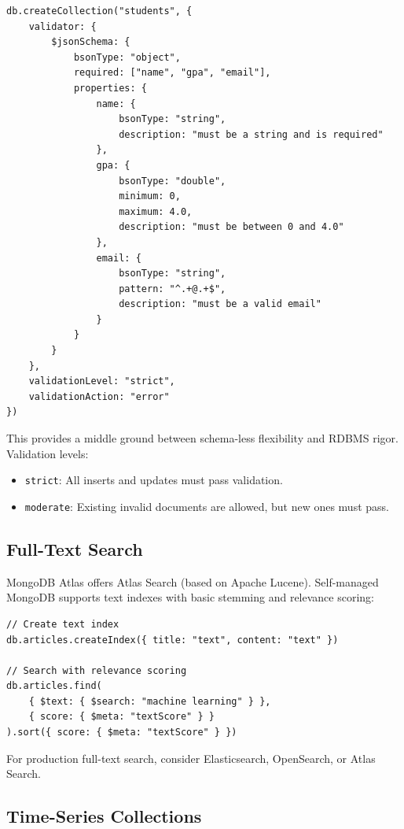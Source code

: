 \documentclass[12pt,a4paper]{article}
\begin{document}
\begin{lstlisting}[language=MongoDB]
db.createCollection("students", {
    validator: {
        $jsonSchema: {
            bsonType: "object",
            required: ["name", "gpa", "email"],
            properties: {
                name: {
                    bsonType: "string",
                    description: "must be a string and is required"
                },
                gpa: {
                    bsonType: "double",
                    minimum: 0,
                    maximum: 4.0,
                    description: "must be between 0 and 4.0"
                },
                email: {
                    bsonType: "string",
                    pattern: "^.+@.+$",
                    description: "must be a valid email"
                }
            }
        }
    },
    validationLevel: "strict",
    validationAction: "error"
})
\end{lstlisting}

This provides a middle ground between schema-less flexibility and RDBMS rigor. Validation levels:
\begin{itemize}[noitemsep]
    \item \texttt{strict}: All inserts and updates must pass validation.
    \item \texttt{moderate}: Existing invalid documents are allowed, but new ones must pass.
\end{itemize}

\subsection{Full-Text Search}

MongoDB Atlas offers Atlas Search (based on Apache Lucene). Self-managed MongoDB supports text indexes with basic stemming and relevance scoring:

\begin{lstlisting}[language=MongoDB]
// Create text index
db.articles.createIndex({ title: "text", content: "text" })

// Search with relevance scoring
db.articles.find(
    { $text: { $search: "machine learning" } },
    { score: { $meta: "textScore" } }
).sort({ score: { $meta: "textScore" } })
\end{lstlisting}

For production full-text search, consider Elasticsearch, OpenSearch, or Atlas Search.

\subsection{Time-Series Collections}
\end{document}
